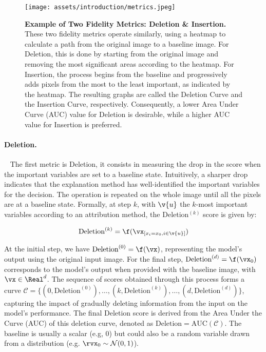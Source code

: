 \begin{figure}[ht]
    \centering
    \texttt{[image: assets/introduction/metrics.jpeg]}
    \caption{\textbf{Example of Two Fidelity Metrics: Deletion \& Insertion.} These two fidelity metrics operate similarly, using a heatmap to calculate a path from the original image to a baseline image. For Deletion, this is done by starting from the original image and removing the most significant areas according to the heatmap. For Insertion, the process begins from the baseline and progressively adds pixels from the most to the least important, as indicated by the heatmap. The resulting graphs are called the Deletion Curve and the Insertion Curve, respectively. Consequently, a lower Area Under Curve (AUC) value for Deletion is desirable, while a higher AUC value for Insertion is preferred.}
    \label{fig:attribution:deletion}
\end{figure}

\paragraph{Deletion.}~\cite{petsiuk2018rise} 
The first metric is Deletion, it consists in measuring the drop in the score when the important variables are set to a baseline state. Intuitively, a sharper drop indicates that the explanation method has well-identified the important variables for the decision. The operation is repeated on the whole image until all the pixels are at a baseline state. Formally, at step $k$, with $\v{u}$ the $k$-most important variables according to an attribution method, the Deletion$^{(k)}$ score is given by:

$$
\text{Deletion}^{(k)} = \f(\vx_{[x_i = x_0, i \in \v{u}]})
$$

At the initial step, we have $\text{Deletion}^{(0)} = \f(\vx)$, representing the model's output using the original input image. For the final step, $\text{Deletion}^{(d)} = \f(\vx_0)$ corresponds to the model's output when provided with the baseline image, with $\vx \in \Real^d$. The sequence of scores obtained through this process forms a curve $\mathcal{C} = \{ (0, \text{Deletion}^{(0)}), \ldots, (k, \text{Deletion}^{(k)}), \ldots, (d, \text{Deletion}^{(d)}) \}$, capturing the impact of gradually deleting information from the input on the model's performance. The final Deletion score is derived from the Area Under the Curve (AUC) of this deletion curve, denoted as $\text{Deletion} = \text{AUC}(\mathcal{C})$. The baseline is usually a scalar (e.g, $0$) but could also be a random variable drawn from a distribution (e.g. $\rvx_0 \sim \mathcal{N}(0, 1)$).

